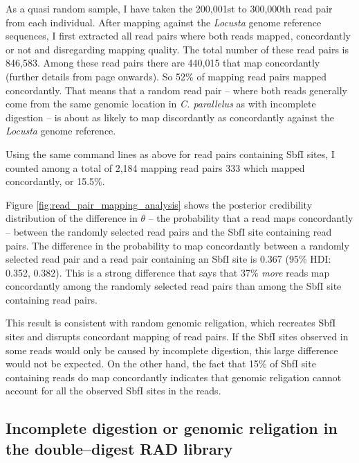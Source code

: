 \documentclass[a4paper,12pt,times,authoryear,twoside,print,index]{Classes/PhDThesisPSnPDF}\usepackage[]{graphicx}\usepackage[]{color}
\begin{document}
As a quasi random sample, I have taken the 200,001st to 300,000th read pair from each individual.
After mapping against the \textit{Locusta} genome reference sequences, I first extracted all read pairs where both reads mapped, \gls{concordant}ly or not and disregarding mapping quality. The total number of these read pairs is 846,583. Among these read pairs there are 440,015 that map \gls{concordant}ly (further details from page \pageref{read_pair_mapping_analysis} onwards). So 52\% of mapping read pairs mapped concordantly. That means that a random read pair -- where both reads generally come from the same genomic location in \textit{C. parallelus} as with incomplete digestion -- is about as likely to map \gls{discordant}ly as \gls{concordant}ly against the \textit{Locusta} genome reference.

Using the same command lines as above for read pairs containing SbfI sites, I counted among a total of 2,184 mapping read pairs 333 which mapped concordantly, or 15.5\%. 

Figure \ref{fig:read_pair_mapping_analysis} shows the posterior credibility distribution of the difference in $\theta$ -- the probability that a read maps concordantly -- between the randomly selected read pairs and the SbfI site containing read pairs. The difference in the probability to map concordantly between a randomly selected read pair and a read pair containing an SbfI site is 0.367 (95\% HDI: 0.352, 0.382). This is a strong difference that says that 37\% \emph{more} reads map concordantly among the randomly selected read pairs than among the SbfI site containing read pairs.

This result is consistent with random genomic religation, which recreates SbfI sites and disrupts concordant mapping of read pairs. If the SbfI sites observed in some reads would only be caused by incomplete digestion, this large difference would not be expected. On the other hand, the fact that 15\% of SbfI site containing reads do map concordantly indicates that genomic religation cannot account for all the observed SbfI sites in the reads.


\subsection{Incomplete digestion or genomic religation in the double--digest RAD library}
\end{document}
